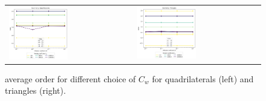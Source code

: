 \begin{figure}[h!]
	\centering
	\begin{tabular}{p{} p{}}
		\vspace{0pt} 
		
\includegraphics[width=0.49\textwidth]{../figs/parametric/diffusion_2D/ord_laplace_2_4}
		&
		\vspace{0pt} 
		
\includegraphics[width=0.49\textwidth]{../figs/parametric/diffusion_2D/ord_laplace_2_3}
	\end{tabular}
	\caption{ average order for different choice of $C_w$ for 
	quadrilaterals (left) and triangles (right).}
	\label{fig:orders_lapalce}
\end{figure}

%		
%		

